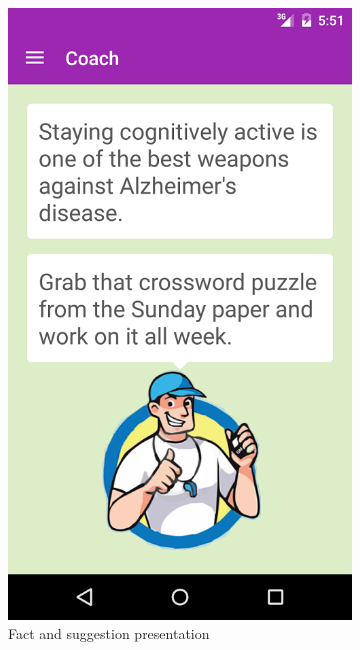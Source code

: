 \begin{figure}[h]
    \centering
    \begin{subfigure}[t]{0.3\textwidth}
        \centering
        \includegraphics[width=\textwidth]{Files/prevention-study-3/figures/gm-new-tips}
        \caption{Fact and suggestion presentation}
        \label{fig: gm-new-tips}
    \end{subfigure}
    \hfill
    \begin{subfigure}[t]{0.3\textwidth}
        \centering

\end{subfigure}
\end{figure}
